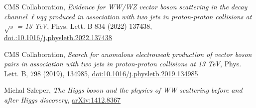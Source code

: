{\begin{flushleft}

 



\end{flushleft}

\begin{thebibliography}{9}
\bibitem{[1]}
CMS Collaboration, {\em Evidence for WW/WZ vector boson scattering in the decay channel $\ell\nu$qq produced in association with two jets in proton-proton collisions at $\sqrt{s}$ = 13 TeV}, Phys. Lett. B 834 (2022) 137438, \href{https://doi.org/10.1016/j.physletb.2022.137438}{doi.:10.1016/j.physletb.2022.137438}

\bibitem{[2]}
CMS Collaboration, {\em Search for anomalous electroweak production of vector boson pairs in association with two jets in proton-proton collisions at 13 TeV}, Phys. Lett. B, 798 (2019), 134985, \href{https://doi.org/10.1016/j.physletb.2019.134985}{doi:10.1016/j.physletb.2019.134985}

\bibitem{[3]}
Michal Szleper, {\em The Higgs boson and the physics of WW scattering before and after Higgs discovery}, \href{https://arxiv.org/pdf/1412.8367}{arXiv:1412.8367}



\end{thebibliography}}
